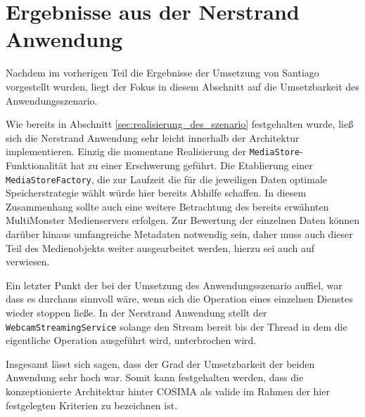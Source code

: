 

\section{Ergebnisse aus der Nerstrand Anwendung} %
\label{sec:ergebnisse_aus_der_nerstrand_anwendung}

  Nachdem im vorherigen Teil die Ergebnisse der Umsetzung von Santiago vorgestellt wurden, liegt der Fokus in diesem Abschnitt auf die Umsetzbarkeit des Anwendungsszenario.
  
  Wie bereits in Abschnitt \ref{sec:realisierung_des_szenario} festgehalten wurde, ließ sich die Nerstrand Anwendung sehr leicht innerhalb der Architektur implementieren. Einzig die momentane Realisierung der \verb!MediaStore!-Funktionalität hat zu einer Erschwerung geführt. Die Etablierung einer \verb!MediaStoreFactory!, die zur Laufzeit die für die jeweiligen Daten optimale Speicherstrategie wählt würde hier bereits Abhilfe schaffen. In diesem Zusammenhang sollte auch eine weitere Betrachtung des bereits erwähnten MultiMonster Medienservers erfolgen. Zur Bewertung der einzelnen Daten können darüber hinaus umfangreiche Metadaten notwendig sein, daher muss auch dieser Teil des Medienobjekts weiter ausgearbeitet werden, hierzu sei auch auf~\citep{lehmann09} verwiesen.
  
  Ein letzter Punkt der bei der Umsetzung des Anwendungsszenario auffiel, war dass es durchaus sinnvoll wäre, wenn sich die Operation eines einzelnen Dienstes wieder stoppen ließe. In der Nerstrand Anwendung stellt der \verb!WebcamStreamingService! solange den Stream bereit bis der Thread in dem die eigentliche Operation ausgeführt wird, unterbrochen wird.


  Insgesamt lässt sich sagen, dass der Grad der Umsetzbarkeit der beiden Anwendung sehr hoch war. Somit kann festgehalten werden, dass die konzeptionierte Architektur hinter COSIMA als valide im Rahmen der hier festgelegten Kriterien zu bezeichnen ist.

